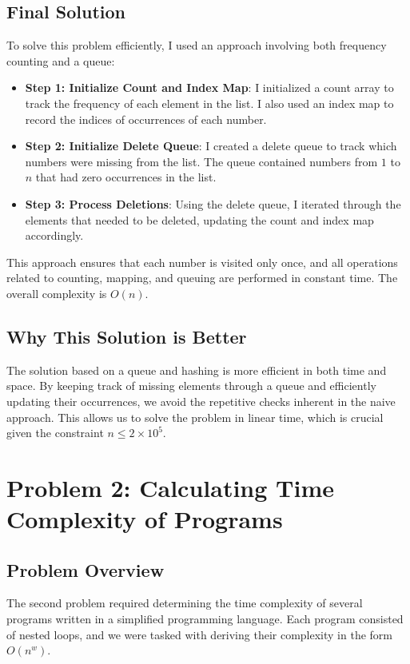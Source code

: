 \documentclass{article}
\begin{document}
\subsection{Final Solution}
To solve this problem efficiently, I used an approach involving both frequency counting and a queue:
\begin{itemize}
    \item \textbf{Step 1: Initialize Count and Index Map}: I initialized a count array to track the frequency of each element in the list. I also used an index map to record the indices of occurrences of each number.
    \item \textbf{Step 2: Initialize Delete Queue}: I created a delete queue to track which numbers were missing from the list. The queue contained numbers from $1$ to $n$ that had zero occurrences in the list.
    \item \textbf{Step 3: Process Deletions}: Using the delete queue, I iterated through the elements that needed to be deleted, updating the count and index map accordingly.
\end{itemize}

This approach ensures that each number is visited only once, and all operations related to counting, mapping, and queuing are performed in constant time. The overall complexity is $O(n)$.

\subsection{Why This Solution is Better}
The solution based on a queue and hashing is more efficient in both time and space. By keeping track of missing elements through a queue and efficiently updating their occurrences, we avoid the repetitive checks inherent in the naive approach. This allows us to solve the problem in linear time, which is crucial given the constraint $n \leq 2 \times 10^5$.

\section{Problem 2: Calculating Time Complexity of Programs}

\subsection{Problem Overview}
The second problem required determining the time complexity of several programs written in a simplified programming language. Each program consisted of nested loops, and we were tasked with deriving their complexity in the form $O(n^w)$.
\end{document}
